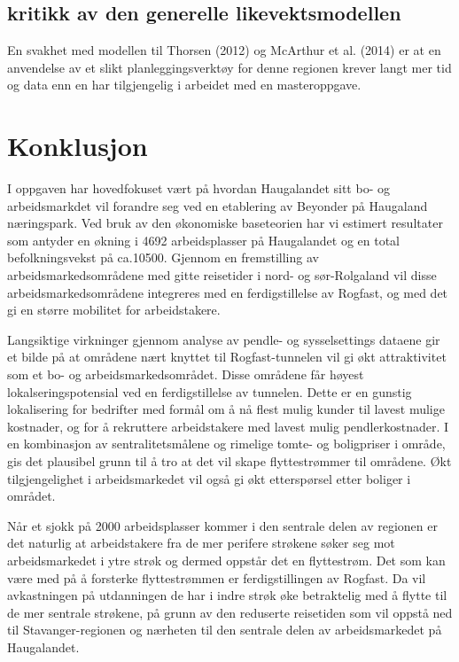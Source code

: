 \documentclass[
]{article}
\begin{document}
\hypertarget{kritikk-av-den-generelle-likevektsmodellen}{%
\subsection{kritikk av den generelle
likevektsmodellen}\label{kritikk-av-den-generelle-likevektsmodellen}}

En svakhet med modellen til Thorsen (2012) og McArthur et al. (2014) er
at en anvendelse av et slikt planleggingsverktøy for denne regionen
krever langt mer tid og data enn en har tilgjengelig i arbeidet med en
masteroppgave.

\newpage

\hypertarget{konklusjon}{%
\section{Konklusjon}\label{konklusjon}}

I oppgaven har hovedfokuset vært på hvordan Haugalandet sitt bo- og
arbeidsmarkdet vil forandre seg ved en etablering av Beyonder på
Haugaland næringspark. Ved bruk av den økonomiske baseteorien har vi
estimert resultater som antyder en økning i 4692 arbeidsplasser på
Haugalandet og en total befolkningsvekst på ca.10500. Gjennom en
fremstilling av arbeidsmarkedsområdene med gitte reisetider i nord- og
sør-Rolgaland vil disse arbeidsmarkedsområdene integreres med en
ferdigstillelse av Rogfast, og med det gi en større mobilitet for
arbeidstakere.

Langsiktige virkninger gjennom analyse av pendle- og sysselsettings
dataene gir et bilde på at områdene nært knyttet til Rogfast-tunnelen
vil gi økt attraktivitet som et bo- og arbeidsmarkedsområdet. Disse
områdene får høyest lokalseringspotensial ved en ferdigstillelse av
tunnelen. Dette er en gunstig lokalisering for bedrifter med formål om å
nå flest mulig kunder til lavest mulige kostnader, og for å rekruttere
arbeidstakere med lavest mulig pendlerkostnader. I en kombinasjon av
sentralitetsmålene og rimelige tomte- og boligpriser i område, gis det
plausibel grunn til å tro at det vil skape flyttestrømmer til områdene.
Økt tilgjengelighet i arbeidsmarkedet vil også gi økt etterspørsel etter
boliger i området.

Når et sjokk på 2000 arbeidsplasser kommer i den sentrale delen av
regionen er det naturlig at arbeidstakere fra de mer perifere strøkene
søker seg mot arbeidsmarkedet i ytre strøk og dermed oppstår det en
flyttestrøm. Det som kan være med på å forsterke flyttestrømmen er
ferdigstillingen av Rogfast. Da vil avkastningen på utdanningen de har i
indre strøk øke betraktelig med å flytte til de mer sentrale strøkene,
på grunn av den reduserte reisetiden som vil oppstå ned til
Stavanger-regionen og nærheten til den sentrale delen av arbeidsmarkedet
på Haugalandet.
\end{document}
